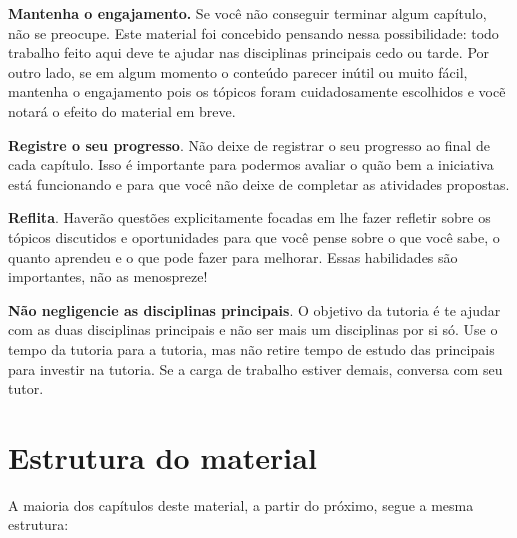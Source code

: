 \documentclass[10pt,openany,twoside=semi]{book}
\theoremstyle{estiloQuestao}
\theoremstyle{estiloQuestao}
\theoremstyle{estiloQuestao}
\theoremstyle{plain}
\theoremstyle{estiloSetinha}
\theoremstyle{estiloSetinha}
\theoremstyle{estiloSetinha}
\theoremstyle{estiloSetinha}
\begin{document}
\textbf{Mantenha o engajamento.} Se você não conseguir terminar algum capítulo, não se preocupe. Este material foi concebido pensando nessa possibilidade: todo trabalho feito aqui deve te ajudar nas disciplinas principais cedo ou tarde. Por outro lado, se em algum momento o conteúdo parecer inútil ou muito fácil, mantenha o engajamento pois os tópicos foram cuidadosamente escolhidos e vocẽ notará o efeito do material em breve.

\textbf{Registre o seu progresso}. Não deixe de registrar o seu progresso ao final de cada capítulo. Isso é importante para podermos avaliar o quão bem a iniciativa está funcionando e para que você não deixe de completar as atividades propostas.

\textbf{Reflita}. Haverão questões explicitamente focadas em lhe fazer refletir sobre os tópicos discutidos e oportunidades para que você pense sobre o que você sabe, o quanto aprendeu e o que pode fazer para melhorar. Essas habilidades são importantes, não as menospreze! 

\textbf{Não negligencie as disciplinas principais}. O objetivo da tutoria é te ajudar com as duas disciplinas principais e não ser mais um disciplinas por si só. Use o tempo da tutoria para a tutoria, mas não retire tempo de estudo das principais para investir na tutoria. Se a carga de trabalho estiver demais, conversa com seu tutor.

\section{Estrutura do material}

A maioria dos capítulos deste material, a partir do próximo, segue a mesma estrutura:
\end{document}
